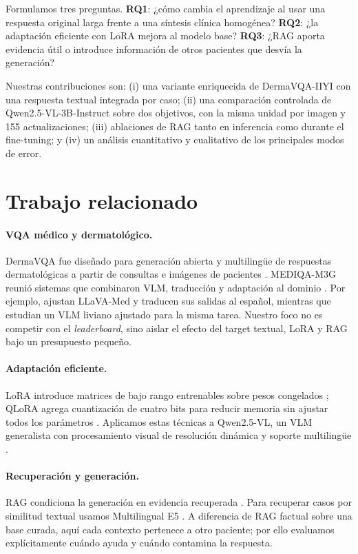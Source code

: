 \documentclass[11pt]{article}
\begin{document}
Formulamos tres preguntas. \textbf{RQ1}: ¿cómo cambia el aprendizaje al usar una respuesta original larga frente a una síntesis clínica homogénea? \textbf{RQ2}: ¿la adaptación eficiente con LoRA mejora al modelo base? \textbf{RQ3}: ¿RAG aporta evidencia útil o introduce información de otros pacientes que desvía la generación?

Nuestras contribuciones son: (i) una variante enriquecida de DermaVQA-IIYI con una respuesta textual integrada por caso; (ii) una comparación controlada de Qwen2.5-VL-3B-Instruct \citep{bai2025qwen25vl} sobre dos objetivos, con la misma unidad por imagen y 155 actualizaciones; (iii) ablaciones de RAG tanto en inferencia como durante el fine-tuning; y (iv) un análisis cuantitativo y cualitativo de los principales modos de error.

\section{Trabajo relacionado}

\paragraph{VQA médico y dermatológico.}
DermaVQA fue diseñado para generación abierta y multilingüe de respuestas dermatológicas a partir de consultas e imágenes de pacientes \citep{yim2024dermavqa}. MEDIQA-M3G reunió sistemas que combinaron VLM, traducción y adaptación al dominio \citep{yim2024mediqa}. Por ejemplo, \citet{bauer2024ikim} ajustan LLaVA-Med y traducen sus salidas al español, mientras que \citet{thomas2024ltrc} estudian un VLM liviano ajustado para la misma tarea. Nuestro foco no es competir con el \emph{leaderboard}, sino aislar el efecto del target textual, LoRA y RAG bajo un presupuesto pequeño.

\paragraph{Adaptación eficiente.}
LoRA introduce matrices de bajo rango entrenables sobre pesos congelados \citep{hu2022lora}; QLoRA agrega cuantización de cuatro bits para reducir memoria sin ajustar todos los parámetros \citep{dettmers2023qlora}. Aplicamos estas técnicas a Qwen2.5-VL, un VLM generalista con procesamiento visual de resolución dinámica y soporte multilingüe \citep{bai2025qwen25vl}.

\paragraph{Recuperación y generación.}
RAG condiciona la generación en evidencia recuperada \citep{lewis2020rag}. Para recuperar casos por similitud textual usamos Multilingual E5 \citep{wang2024multilinguale5}. A diferencia de RAG factual sobre una base curada, aquí cada contexto pertenece a otro paciente; por ello evaluamos explícitamente cuándo ayuda y cuándo contamina la respuesta.
\end{document}
